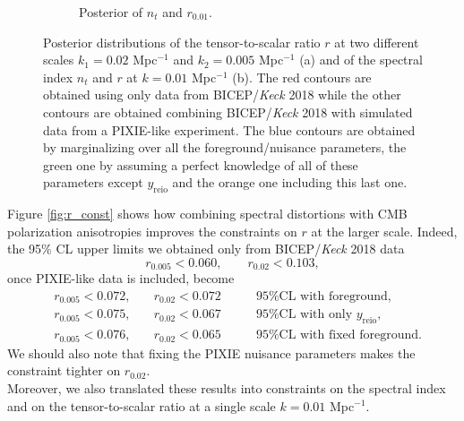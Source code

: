 \begin{figure}[ht]
\begin{subfigure}[b]{.49\textwidth}
            \caption{Posterior of $n_t$ and $r_{0.01}$.}
            \label{fig:nt_const} 
        \end{subfigure}
        \caption{Posterior distributions of the tensor-to-scalar ratio $r$ at two different scales $k_1=0.02$ Mpc$^{-1}$ and $k_2=0.005$ Mpc$^{-1}$ (a) and of the spectral index $n_t$ and $r$ at $k=0.01$ Mpc$^{-1}$ (b). The red contours are obtained using only data from BICEP/\textit{Keck} 2018 \cite{Ade_2021} while the other contours are obtained combining BICEP/\textit{Keck} 2018 with simulated data from a PIXIE-like experiment. The blue contours are obtained by marginalizing over all the foreground/nuisance parameters, the green one by assuming a perfect knowledge of all of these parameters except $y_\text{reio}$ and the orange one including this last one.}       
    \end{figure}
Figure \ref{fig:r_const} shows how combining spectral distortions with CMB polarization anisotropies improves the constraints on $r$ at the larger scale. Indeed, the 95\% CL upper limits we obtained only from BICEP/\textit{Keck} 2018 data
$$r_{0.005}<0.060,\qquad r_{0.02}<0.103,$$
once PIXIE-like data is included, become 
\begin{align*}
    &r_{0.005}<0.072,\quad &r_{0.02}<0.072\qquad&\text{95\%CL with foreground,}\\
    &r_{0.005}<0.075,\quad &r_{0.02}<0.067\qquad&\text{95\%CL with only $y_{\text{reio}}$,}\\
    &r_{0.005}<0.076,\quad &r_{0.02}<0.065\qquad&\text{95\%CL with fixed foreground}.
\end{align*}
We should also note that fixing the PIXIE nuisance parameters makes the constraint tighter on $r_{0.02}$.\\ 
Moreover, we also translated these results into constraints on the spectral index and on the tensor-to-scalar ratio at a single scale $k=0.01$ Mpc$^{-1}$. 
